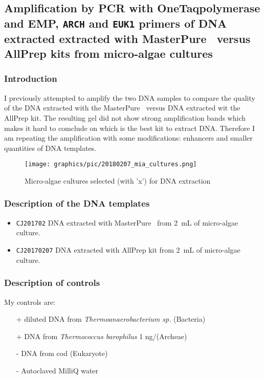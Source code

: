 \subsection{Amplification by PCR with OneTaq\cR polymerase and EMP, \texttt{ARCH} and \texttt{EUK1} primers of DNA extracted extracted with MasterPure\texttrademark~ versus AllPrep kits from micro-algae cultures}
\label{task:20180210_cj0}

\subsubsection{Introduction}
I previously attempted to amplify the two DNA samples to compare the quality of the DNA extracted with the MasterPure\texttrademark~ versus DNA extracted wit the AllPrep kit. The resulting gel did not show strong amplification bands which makes it hard to comclude on which is the best kit to extract DNA. Therefore I am repeating the amplification with some modifications: enhancers and smaller quantities of DNA templates.

\begin{figure}[H] %
    \centering
    \caption{Micro-algae cultures selected (with 'x') for DNA extraction}
    \label{fig:20180207_mia_cultures}
    \texttt{[image: graphics/pic/20180207\_mia\_cultures.png]}
\end{figure}


\subsubsection{Description of the DNA templates}
\begin{itemize}
\item \texttt{CJ201702} DNA extracted with MasterPure\texttrademark~ from 2~mL of micro-algae culture.
\item \texttt{CJ20170207} DNA extracted with AllPrep kit from 2~mL of micro-algae culture.
\end{itemize}

\subsubsection{Description of controls}
My controls are:
\begin{itemize}
\item[+] diluted DNA from \textit{Thermoanaerobacterium sp.} (Bacteria)
\item[+] DNA from \textit{Thermococcus barophilus} 1 ng/\uL (Archeae)
\item[-] DNA from cod (Eukaryote)
\item[-] Autoclaved MilliQ water
\end{itemize}


